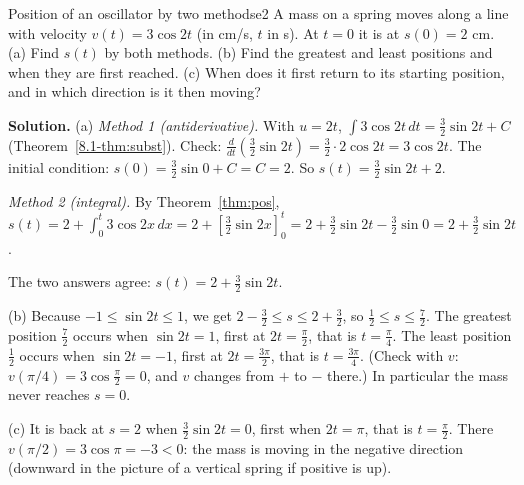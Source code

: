 \documentclass[11pt]{article}
\begin{document}
\begin{exmp}{Position of an oscillator by two methods}{e2}
A mass on a spring moves along a line with velocity $v(t)=3\cos2t$ (in cm/s, $t$ in s). At $t=0$ it is at $s(0)=2$ cm. (a) Find $s(t)$ by both methods. (b) Find the greatest and least positions and when they are first reached. (c) When does it first return to its starting position, and in which direction is it then moving?

\textbf{Solution.} (a) \emph{Method 1 (antiderivative).} With $u=2t$, $\int3\cos2t\,dt=\frac32\sin2t+C$ (Theorem~\ref{8.1-thm:subst}). Check: $\frac{d}{dt}\left(\frac32\sin2t\right)=\frac32\cdot2\cos2t=3\cos2t$. The initial condition: $s(0)=\frac32\sin0+C=C=2$. So $s(t)=\frac32\sin2t+2$.

\emph{Method 2 (integral).} By Theorem~\ref{thm:pos}, $s(t)=2+\int_0^t3\cos2x\,dx=2+\left[\frac32\sin2x\right]_0^t=2+\frac32\sin2t-\frac32\sin0=2+\frac32\sin2t$.

The two answers agree: $s(t)=2+\frac32\sin2t$.

(b) Because $-1\le\sin2t\le1$, we get $2-\frac32\le s\le2+\frac32$, so $\frac12\le s\le\frac72$. The greatest position $\frac72$ occurs when $\sin2t=1$, first at $2t=\frac\pi2$, that is $t=\frac\pi4$. The least position $\frac12$ occurs when $\sin2t=-1$, first at $2t=\frac{3\pi}2$, that is $t=\frac{3\pi}4$. (Check with $v$: $v(\pi/4)=3\cos\frac\pi2=0$, and $v$ changes from $+$ to $-$ there.) In particular the mass never reaches $s=0$.

(c) It is back at $s=2$ when $\frac32\sin2t=0$, first when $2t=\pi$, that is $t=\frac\pi2$. There $v(\pi/2)=3\cos\pi=-3<0$: the mass is moving in the negative direction (downward in the picture of a vertical spring if positive is up).
\end{exmp}
\end{document}
